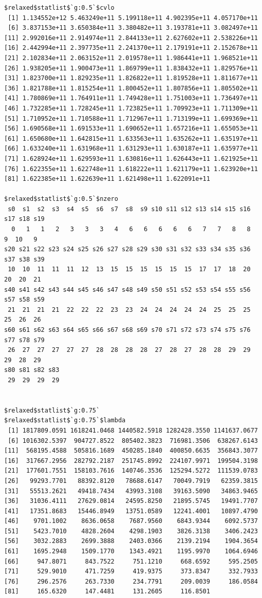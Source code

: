 \documentclass[
]{article}
\begin{document}
\begin{verbatim}
$relaxed$statlist$`g:0.5`$cvlo
 [1] 1.134552e+12 5.463249e+11 5.199118e+11 4.902395e+11 4.057170e+11
 [6] 3.837153e+11 3.650384e+11 3.380482e+11 3.193781e+11 3.082497e+11
[11] 2.992016e+11 2.914974e+11 2.844133e+11 2.627602e+11 2.538226e+11
[16] 2.442994e+11 2.397735e+11 2.241370e+11 2.179191e+11 2.152678e+11
[21] 2.102834e+11 2.063152e+11 2.019578e+11 1.986441e+11 1.968521e+11
[26] 1.938205e+11 1.900473e+11 1.869799e+11 1.838432e+11 1.829576e+11
[31] 1.823700e+11 1.829235e+11 1.826822e+11 1.819528e+11 1.811677e+11
[36] 1.821788e+11 1.815254e+11 1.800452e+11 1.807856e+11 1.805502e+11
[41] 1.780869e+11 1.764911e+11 1.749428e+11 1.751003e+11 1.736497e+11
[46] 1.732285e+11 1.728245e+11 1.723825e+11 1.709923e+11 1.711309e+11
[51] 1.710952e+11 1.710588e+11 1.712967e+11 1.713199e+11 1.699369e+11
[56] 1.690568e+11 1.691533e+11 1.690652e+11 1.657216e+11 1.655053e+11
[61] 1.650680e+11 1.642815e+11 1.633563e+11 1.635262e+11 1.635197e+11
[66] 1.633240e+11 1.631968e+11 1.631293e+11 1.630187e+11 1.635977e+11
[71] 1.628924e+11 1.629593e+11 1.630816e+11 1.626443e+11 1.621925e+11
[76] 1.622355e+11 1.622748e+11 1.618222e+11 1.621179e+11 1.623920e+11
[81] 1.622385e+11 1.622639e+11 1.621498e+11 1.622091e+11

$relaxed$statlist$`g:0.5`$nzero
 s0  s1  s2  s3  s4  s5  s6  s7  s8  s9 s10 s11 s12 s13 s14 s15 s16 s17 s18 s19 
  0   1   1   2   3   3   3   4   6   6   6   6   6   7   7   8   8   9  10   9 
s20 s21 s22 s23 s24 s25 s26 s27 s28 s29 s30 s31 s32 s33 s34 s35 s36 s37 s38 s39 
 10  10  11  11  11  12  13  15  15  15  15  15  15  17  17  18  20  20  20  21 
s40 s41 s42 s43 s44 s45 s46 s47 s48 s49 s50 s51 s52 s53 s54 s55 s56 s57 s58 s59 
 21  21  21  21  22  22  22  23  23  24  24  24  24  24  25  25  25  25  26  26 
s60 s61 s62 s63 s64 s65 s66 s67 s68 s69 s70 s71 s72 s73 s74 s75 s76 s77 s78 s79 
 26  27  27  27  27  27  28  28  28  28  27  28  27  28  28  29  29  29  28  29 
s80 s81 s82 s83 
 29  29  29  29 


$relaxed$statlist$`g:0.75`
$relaxed$statlist$`g:0.75`$lambda
 [1] 1817809.0591 1618241.0468 1440582.5918 1282428.3550 1141637.0677
 [6] 1016302.5397  904727.8522  805402.3823  716981.3506  638267.6143
[11]  568195.4588  505816.1689  450285.1840  400850.6635  356843.3077
[16]  317667.2956  282792.2187  251745.8992  224107.9971  199504.3198
[21]  177601.7551  158103.7616  140746.3536  125294.5272  111539.0783
[26]   99293.7701   88392.8120   78688.6147   70049.7919   62359.3815
[31]   55513.2621   49418.7434   43993.3108   39163.5090   34863.9465
[36]   31036.4111   27629.0814   24595.8250   21895.5745   19491.7707
[41]   17351.8683   15446.8949   13751.0589   12241.4001   10897.4790
[46]    9701.1002    8636.0658    7687.9560    6843.9344    6092.5737
[51]    5423.7010    4828.2604    4298.1903    3826.3138    3406.2423
[56]    3032.2883    2699.3888    2403.0366    2139.2194    1904.3654
[61]    1695.2948    1509.1770    1343.4921    1195.9970    1064.6946
[66]     947.8071     843.7522     751.1210     668.6592     595.2505
[71]     529.9010     471.7259     419.9375     373.8347     332.7933
[76]     296.2576     263.7330     234.7791     209.0039     186.0584
[81]     165.6320     147.4481     131.2605     116.8501


\end{verbatim}
\end{document}
